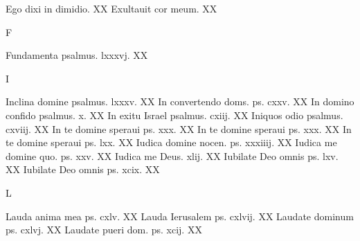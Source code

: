\documentclass[a5paper,10pt]{book}
\begin{document}
\begin{multicols}{2}
\newline Ego dixi in dimidio. \hfill XX
\newline Exultauit cor meum. \hfill XX
\newline \vspace{-1.75em}
\begin{center}
\color{red} F
\end{center}
\vspace{-.75em}
\par \noindent Fundamenta psalmus. lxxxvj. \hfill XX
\newline \vspace{-1.75em}
\begin{center}
\color{red} I
\end{center}
\vspace{-.75em}
\par \noindent Inclina domine psalmus. lxxxv. \hfill XX
\newline In convertendo doms. ps. cxxv. \hfill XX
\newline In domino confido psalmus. x. \hfill XX
\newline In exitu Israel psalmus. cxiij. \hfill XX
\newline Iniquos odio psalmus. cxviij. \hfill XX
\newline In te domine speraui ps. xxx. \hfill XX
\newline In te domine speraui ps. xxx. \hfill XX
\newline In te domine speraui ps. lxx. \hfill XX
\newline Iudica domine nocen. ps. xxxiiij. \hfill XX
\newline Iudica me domine quo. ps. xxv. \hfill XX
\newline Iudica me Deus. xlij. \hfill XX
\newline Iubilate Deo omnis ps. lxv. \hfill XX
\newline Iubilate Deo omnis ps. xcix. \hfill XX
\newline \vspace{-1.75em}
\begin{center}
\color{red} L
\end{center}
\vspace{-.75em}
\par \noindent Lauda anima mea ps. cxlv. \hfill XX
\newline Lauda Ierusalem ps. cxlvij. \hfill XX
\newline Laudate dominum ps. cxlvj. \hfill XX
\newline Laudate pueri dom. ps. xcij. \hfill XX

\end{multicols}
\end{document}
